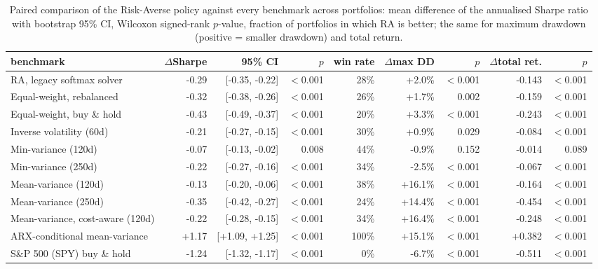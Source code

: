 \begin{table}[ht!]
\centering
\footnotesize
\setlength{\tabcolsep}{4pt}
\begin{tabular}{lrrrrrrrr}
\hline
benchmark & $\Delta$Sharpe & 95\% CI & $p$ & win rate & $\Delta$max DD & $p$ & $\Delta$total ret. & $p$ \\
\hline
RA, legacy softmax solver & -0.29 & [-0.35, -0.22] & $<$0.001 & 28\% & +2.0\% & $<$0.001 & -0.143 & $<$0.001 \\
Equal-weight, rebalanced & -0.32 & [-0.38, -0.26] & $<$0.001 & 26\% & +1.7\% & 0.002 & -0.159 & $<$0.001 \\
Equal-weight, buy \& hold & -0.43 & [-0.49, -0.37] & $<$0.001 & 20\% & +3.3\% & $<$0.001 & -0.243 & $<$0.001 \\
Inverse volatility (60d) & -0.21 & [-0.27, -0.15] & $<$0.001 & 30\% & +0.9\% & 0.029 & -0.084 & $<$0.001 \\
Min-variance (120d) & -0.07 & [-0.13, -0.02] & 0.008 & 44\% & -0.9\% & 0.152 & -0.014 & 0.089 \\
Min-variance (250d) & -0.22 & [-0.27, -0.16] & $<$0.001 & 34\% & -2.5\% & $<$0.001 & -0.067 & $<$0.001 \\
Mean-variance (120d) & -0.13 & [-0.20, -0.06] & $<$0.001 & 38\% & +16.1\% & $<$0.001 & -0.164 & $<$0.001 \\
Mean-variance (250d) & -0.35 & [-0.42, -0.27] & $<$0.001 & 24\% & +14.4\% & $<$0.001 & -0.454 & $<$0.001 \\
Mean-variance, cost-aware (120d) & -0.22 & [-0.28, -0.15] & $<$0.001 & 34\% & +16.4\% & $<$0.001 & -0.248 & $<$0.001 \\
ARX-conditional mean-variance & +1.17 & [+1.09, +1.25] & $<$0.001 & 100\% & +15.1\% & $<$0.001 & +0.382 & $<$0.001 \\
S\&P 500 (SPY) buy \& hold & -1.24 & [-1.32, -1.17] & $<$0.001 & 0\% & -6.7\% & $<$0.001 & -0.511 & $<$0.001 \\
\hline
\end{tabular}
\caption{Paired comparison of the Risk-Averse policy against every benchmark across portfolios: mean difference of the annualised Sharpe ratio with bootstrap 95\% CI, Wilcoxon signed-rank $p$-value, fraction of portfolios in which RA is better; the same for maximum drawdown (positive = smaller drawdown) and total return.}
\label{tab:bench_paired}
\end{table}
